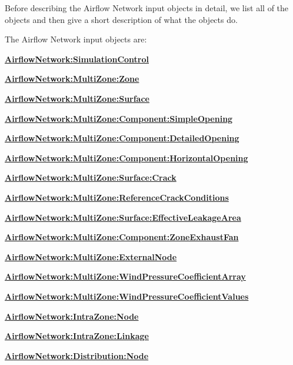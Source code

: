 Before describing the Airflow Network input objects in detail, we list all of the objects and then give a short description of what the objects do.

The Airflow Network input objects are:

\textbf{\hyperref[airflownetworksimulationcontrol]{AirflowNetwork:\hyperref[simulationcontrol]{SimulationControl}}}

\textbf{\hyperref[airflownetworkmultizonezone]{AirflowNetwork:MultiZone:Zone}}

\textbf{\hyperref[airflownetworkmultizonesurface]{AirflowNetwork:MultiZone:Surface}}

\textbf{\hyperref[airflownetworkmultizonecomponentsimpleopening]{AirflowNetwork:MultiZone:Component:SimpleOpening}}

\textbf{\hyperref[airflownetworkmultizonecomponentdetailedopening]{AirflowNetwork:MultiZone:Component:DetailedOpening}}

\textbf{\hyperref[airflownetworkmultizonecomponenthorizontalopening]{AirflowNetwork:MultiZone:Component:HorizontalOpening}}

\textbf{\hyperref[airflownetworkmultizonesurfacecrack]{AirflowNetwork:MultiZone:Surface:Crack}}

\textbf{\hyperref[airflownetworkmultizonereferencecrackconditions]{AirflowNetwork:MultiZone:ReferenceCrackConditions}}

\textbf{\hyperref[airflownetworkmultizonesurfaceeffectiveleakagearea]{AirflowNetwork:MultiZone:Surface:EffectiveLeakageArea}}

\textbf{\hyperref[airflownetworkmultizonecomponentzoneexhaustfan]{AirflowNetwork:MultiZone:Component:ZoneExhaustFan}}

\textbf{\hyperref[airflownetworkmultizoneexternalnode]{AirflowNetwork:MultiZone:ExternalNode}}

\textbf{\hyperref[airflownetworkmultizonewindpressurecoefficientarray]{AirflowNetwork:MultiZone:WindPressureCoefficientArray}}

\textbf{\hyperref[airflownetworkmultizonewindpressurecoefficientvalues]{AirflowNetwork:MultiZone:WindPressureCoefficientValues}}

\textbf{\hyperref[airflownetworkintrazonenode]{AirflowNetwork:IntraZone:Node}}

\textbf{\hyperref[airflownetworkintrazonelinkage]{AirflowNetwork:IntraZone:Linkage}}

\textbf{\hyperref[airflownetworkdistributionnode]{AirflowNetwork:Distribution:Node}}


